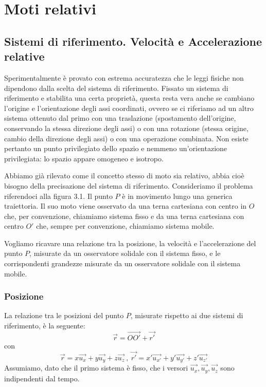 \documentclass[class=book, crop=false, oneside, 12pt]{standalone}
\begin{document}
\chapter{Moti relativi}

\section{Sistemi di riferimento. Velocità e Accelerazione relative}

Sperimentalmente è provato con estrema accuratezza che le leggi fisiche non dipendono dalla scelta del sistema di riferimento. 
Fissato un sistema di riferimento e stabilita una certa proprietà, questa resta vera anche se cambiano l'origine e l'orientazione degli assi coordinati, ovvero se ci riferiamo ad un altro sistema ottenuto dal primo con una traslazione (spostamento dell'origine, conservando la stessa direzione degli assi) o con una rotazione (stessa origine, cambio della direzione degli assi) o con una operazione combinata.
Non esiste pertanto un punto privilegiato dello spazio e nemmeno un'orientazione privilegiata: lo spazio appare omogeneo e isotropo. 

Abbiamo già rilevato come il concetto stesso di moto sia relativo,  abbia cioè bisogno della precisazione del sistema di riferimento. 
Consideriamo il problema riferendoci alla figura 3.1. 
Il punto \(P\) è in movimento lungo una generica traiettoria. 
Il suo moto viene osservato da una terna cartesiana con centro in \(O\) che, per convenzione, chiamiamo sistema fisso e da una terna cartesiana con centro \(O'\) che, sempre per convenzione, chiamiamo sistema mobile.

Vogliamo ricavare una relazione tra la posizione, la velocità e l'accelerazione del punto \(P\), misurate da un osservatore solidale con il sistema fisso, e le corrispondenti grandezze misurate da un osservatore solidale con il sistema mobile. 

\subsection{Posizione}

La relazione tra le posizioni del punto \(P\), misurate rispetto ai due sistemi di riferimento, è la seguente:
\begin{equation} \label{pos_p}
    \overrightarrow{r} = \overrightarrow{OO'} + \overrightarrow{r'}
\end{equation}
con 
\begin{equation*}
    \overrightarrow{r} = x \overrightarrow{u_x} + y \overrightarrow{u_y} + z \overrightarrow{u_z} \ , \ \overrightarrow{r'} = x' \overrightarrow{u_{x'}} + y' \overrightarrow{u_{y'}} + z' \overrightarrow{u_{z'}} 
\end{equation*}
Assumiamo, dato che il primo sistema è fisso, che i versori \(\overrightarrow{u_x}, \overrightarrow{u_y}, \overrightarrow{u_z}\) sono indipendenti dal tempo.
\end{document}
